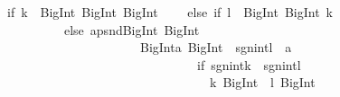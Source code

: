 \begin{isabellebody}
\begin{isamarkuptext}
\ \ {}if\ {}k\ {}{}\ BigInt{}{}{}{}\ {}BigInt{}{}{}{}\ BigInt{}{}{}{}\isanewline
\ \ \ \ else\ {}if\ {}l\ {}{}\ BigInt{}{}{}{}\ {}BigInt{}{}{}{}\ k{}\isanewline
\ \ \ \ \ \ \ \ \ \ \ else\ apsnd{}BigInt{}\ BigInt{}\isanewline
\ \ \ \ \ \ \ \ \ \ \ \ \ \ \ \ \ \ \ \ \ \ \ BigInt{}{}{}a{}\ BigInt{}\ {}{}\ sgn{}int{}l{}\ {}\ a{}\isanewline
\ \ \ \ \ \ \ \ \ \ \ \ \ \ \ \ \ \ \ \ \ \ \ \ \ \ \ \ \ \ \ \ {}if\ {}sgn{}int{}k{}\ {}{}\ sgn{}int{}l{}{}\isanewline
\ \ \ \ \ \ \ \ \ \ \ \ \ \ \ \ \ \ \ \ \ \ \ \ \ \ \ \ \ \ \ \ \ \ {}{}k{}\ BigInt{}\ {}{}\ {}l{}\ BigInt{}\ {}{}\isanewline

\end{isamarkuptext}
\end{isabellebody}
